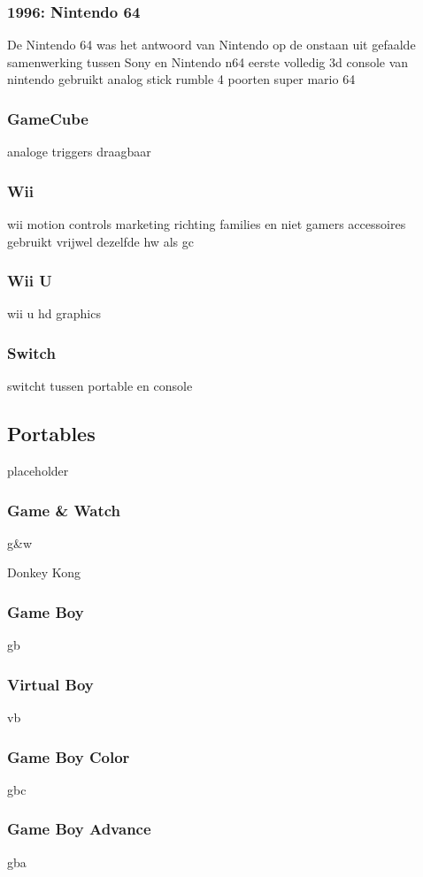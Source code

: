 \documentclass{article}
\begin{document}
\subsubsection{1996: Nintendo 64}
De Nintendo 64 was het antwoord van Nintendo op de 
onstaan uit gefaalde samenwerking tussen Sony en Nintendo
n64
eerste volledig 3d console van nintendo
gebruikt analog stick
rumble
4 poorten 
super mario 64
\subsubsection{GameCube}
analoge triggers
draagbaar


\subsubsection{Wii}
wii
motion controls
marketing richting families en niet gamers
accessoires
gebruikt vrijwel dezelfde hw als gc

\subsubsection{Wii U}
wii u
hd graphics

\subsubsection{Switch}
switcht tussen portable en console

\subsection{Portables}
placeholder
\subsubsection{Game \& Watch}
g\&w

Donkey Kong
\subsubsection{Game Boy}
gb
\subsubsection{Virtual Boy}
vb
\subsubsection{Game Boy Color}
gbc
\subsubsection{Game Boy Advance}
gba
\end{document}
